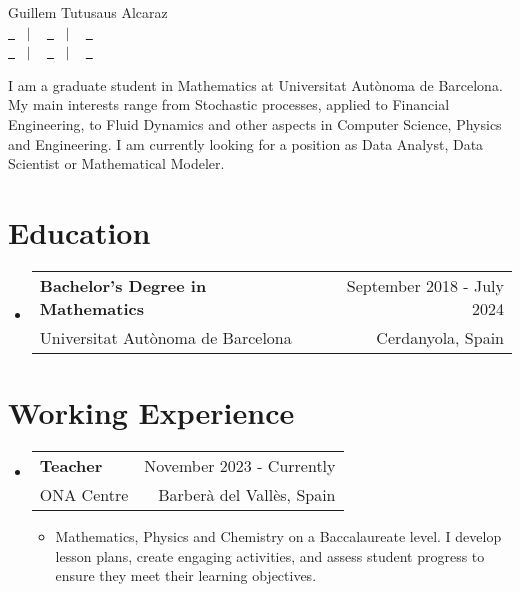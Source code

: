 \documentclass[a4paper,11pt,dvipsnames]{article}
\makeatletter
\newcommand{\resumeQuadHeading}[4]{
	\item
	\begin{tabular*}{0.96\textwidth}[t]{l@{\extracolsep{\fill}}r}
		\textbf{#1} & \small #2 \\
		\small#3 & \small #4 \\
	\end{tabular*}
}
\newcommand{\resumeHeadingListStart}{
	\begin{itemize}[leftmargin=0.15in, label={}]
	}
\newcommand{\resumeHeadingListEnd}{\end{itemize}}
\makeatother
\begin{document}
	
	\begin{center}
		{\Huge Guillem Tutusaus Alcaraz\vspace{2pt}} \\[1.25pc]
		\href{https://guillemtutusausalcaraz.weebly.com/}{\faLink \ } \ $|$ \ %
		\href{https://www.linkedin.com/in/guillemtutusausalcaraz/}{\faLinkedinSquare \ } \ $|$ \ %
		\href{https://github.com/Tutusaus}{\faGithub \ } \\[0.1pc] %
		\href{tel:+32674294157}{\faPhone \ } \ $|$ \ %
		\href{mailto:guillemtutusaus@gmail.com}{\faEnvelope \ } \ $|$ \ %
		\href{https://www.google.es/maps/place/Terrassa,+Barcelona/@41.558308,1.9759349,13z/data=!3m1!4b1!4m6!3m5!1s0x12a492e820fabbfd:0xab0d33c5f2c73098!8m2!3d41.5631482!4d2.0054917!16zL20vMGoycTc?hl=ca&entry=ttu}{\faHome \ } \\[1.5pc] %
	\end{center}
	
	\begin{justify}
		I am a graduate student in Mathematics at Universitat Autònoma de Bar\-ce\-lo\-na. My main interests range from Stochastic processes, applied to Financial Engineering, to Fluid Dynamics and other aspects in Computer Science, Physics and Engineering. I am currently looking for a position as Data Analyst, Data Scientist or Mathematical Modeler.
	\end{justify}
	
	
	
	\section{Education}
	
	\resumeHeadingListStart{}
	\resumeQuadHeading{Bachelor's Degree in Mathematics}{September 2018 - July 2024}
	{Universitat Autònoma de Barcelona}{Cerdanyola, Spain}
	\resumeHeadingListEnd{}
	
	
	\section{Working Experience}	
	\resumeHeadingListStart{}
	\resumeQuadHeading{Teacher}{November 2023 - Currently}
	{ONA Centre}{Barberà del Vallès, Spain}
	\begin{itemize}[leftmargin=3em, itemsep=0.1em, topsep=2pt]
		\item \small Mathematics, Physics and Chemistry on a Baccalaureate level. I develop lesson plans, create engaging activities, and assess student progress to ensure they meet their learning objectives.
	\end{itemize}
	\resumeHeadingListEnd{}
	
\end{document}
